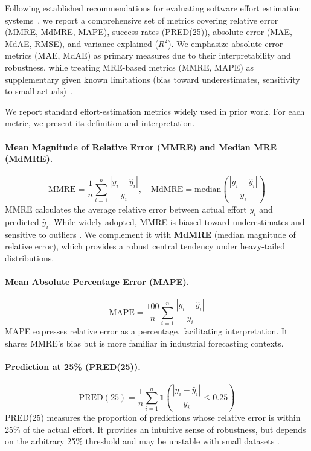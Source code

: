\documentclass{ieeeaccess}
\begin{document}
Following established recommendations for evaluating software effort estimation systems~\cite{shepperd2012evaluating,kitchenham2001evaluating}, we report a comprehensive set of metrics covering relative error (MMRE, MdMRE, MAPE), success rates (PRED(25)), absolute error (MAE, MdAE, RMSE), and variance explained ($R^2$). We emphasize absolute-error metrics (MAE, MdAE) as primary measures due to their interpretability and robustness, while treating MRE-based metrics (MMRE, MAPE) as supplementary given known limitations (bias toward underestimates, sensitivity to small actuals)~\cite{foss2003bias,shepperd2012evaluating}.

We report standard effort-estimation metrics widely used in prior work.
For each metric, we present its definition and interpretation.

\paragraph{Mean Magnitude of Relative Error (MMRE) and Median MRE (MdMRE).}
\begin{equation}
\mathrm{MMRE} = \frac{1}{n}\sum_{i=1}^{n}\frac{|y_i-\hat{y}_i|}{y_i}, \quad
\mathrm{MdMRE} = \text{median}\left(\frac{|y_i-\hat{y}_i|}{y_i}\right)
\label{eq:mmre-mdmre}
\end{equation}
MMRE calculates the average relative error between actual effort $y_i$ and predicted $\hat{y}_i$. While widely adopted, MMRE is biased toward underestimates and sensitive to outliers \cite{kitchenham2001evaluating,foss2003bias}. We complement it with \textbf{MdMRE} (median magnitude of relative error), which provides a robust central tendency under heavy-tailed distributions.

\paragraph{Mean Absolute Percentage Error (MAPE).}
\begin{equation}
\mathrm{MAPE} = \frac{100}{n}\sum_{i=1}^{n}\frac{|y_i-\hat{y}_i|}{y_i}
\label{eq:mape}
\end{equation}
MAPE expresses relative error as a percentage, facilitating interpretation. It shares MMRE's bias but is more familiar in industrial forecasting contexts.

\paragraph{Prediction at 25\% (PRED(25)).}
\begin{equation}
\mathrm{PRED}(25) = \frac{1}{n}\sum_{i=1}^{n}\mathbf{1}\!\left(\frac{|y_i-\hat{y}_i|}{y_i}\le 0.25\right)
\label{eq:pred25}
\end{equation}
PRED(25) measures the proportion of predictions whose relative error is 
within 25\% of the actual effort. It provides an intuitive sense of 
robustness, but depends on the arbitrary 25\% threshold and may be 
unstable with small datasets \cite{kitchenham2001evaluating}.
\end{document}
